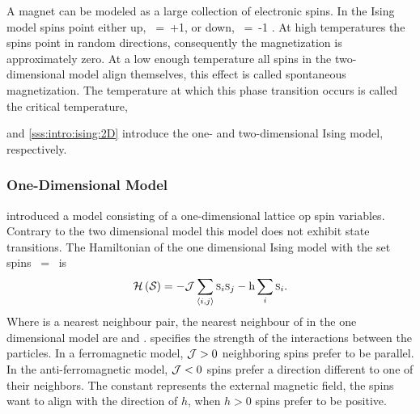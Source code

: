 A magnet can be modeled as a large collection of electronic spins. In the Ising model spins point either up, \mbox{\spin{} = +1}, or down, \mbox{\spin{} = -1} \cite{strogatz2014nonlinear}. At high temperatures the spins point in random directions, consequently the magnetization is approximately zero. At a low enough temperature all spins in the two-dimensional model align themselves, this effect is called spontaneous magnetization. The temperature at which this phase transition occurs is called the critical temperature, \criticalTemperature \cite{cai20011Handout}

 and \ref{sss:intro:ising:2D} introduce the one- and two-dimensional Ising model, respectively. 

\subsubsection{One-Dimensional Model}
	\label{sss:intro:ising:1D}
	\textcite{ising1925beitrag} introduced a model consisting of a one-dimensional lattice op spin variables. Contrary to the two dimensional model this model does not exhibit state transitions. The Hamiltonian of the one dimensional Ising model with the set spins \mbox{\configuration{} = \spinset} is
	\begin{equation}\label{eq:intro:ising:1D:hamiltonian}
		\mathcal{H}\left(\mathcal{S}_{} \right) = - \mathcal{J} \sum_{\left\langle i, j\right\rangle}\textsc{s}_{i}\textsc{s}_{j} - \mathrm{h} \sum_{i} \textsc{s}_{i}.
	\end{equation}
	Where  is a nearest neighbour pair, the nearest neighbour of  in the one dimensional model are  and . \interactionStrength specifies the strength of the interactions between the particles. In a ferromagnetic model, \mbox{$\mathcal{J} > 0$} neighboring spins prefer to be parallel. In the anti-ferromagnetic model, \mbox{$\mathcal{J} < 0$} spins prefer a direction different to one of their neighbors. The constant \magneticMoment represents the external magnetic field, the spins want to align with the direction of $h$, \ie when \mbox{$h > 0$} spins prefer to be positive. 

